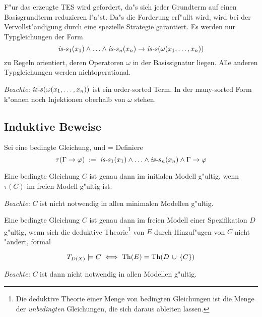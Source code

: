 F"ur das erzeugte TES wird gefordert, da"s sich jeder Grundterm auf
einen Basisgrundterm reduzieren l"a"st.
Da"s die Forderung erf"ullt wird, wird bei der Vervollst"andigung durch
eine spezielle Strategie garantiert. Es werden nur Typgleichungen der
Form
\[ \clause{\tp{s_1}(x_1) \cand \ldots \cand \tp{s_n}(x_n)}
          {\tp{s}(\omega(x_1,\ldots,x_n))} \]
zu Regeln orientiert, deren Operatoren $\omega$ in der Basissignatur
liegen. Alle anderen Typgleichungen werden nichtoperational. 

{\em Beachte:}
\( \tp{s}(\omega(x_1,\ldots,x_n)) \)
ist ein order-sorted Term. In der many-sorted Form k"onnen noch
Injektionen oberhalb von $\omega$ stehen.


\subsection{Induktive Beweise}

Sei \clause{\Gamma}{\varphi} eine bedingte Gleichung, und
\varsOf{\clause{\Gamma}{\varphi}}=
Definiere
\[ \tau(\clause{\Gamma}{\varphi}) 
   \dfeq \clause{\tp{s_1}(x_1) \cand \ldots \cand \tp{s_n}(x_n) \cand \Gamma}
                {\varphi}
\]

Eine bedingte Gleichung $C$ ist genau dann im initialen Modell g"ultig,
wenn $\tau(C)$ im freien Modell g"ultig ist.

{\em Beachte:}
$C$ ist nicht notwendig in allen minimalen Modellen g"ultig.

Eine bedingte Gleichung $C$ ist genau dann im freien Modell  einer
Spezifikation $D$ g"ultig, wenn sich die deduktive Theorie\footnote{
Die deduktive Theorie einer Menge von bedingten Gleichungen ist die Menge der
{\em unbedingten} Gleichungen, die sich daraus ableiten lassen.
}
von $E$ durch Hinzuf"ugen von $C$ nicht "andert, formal

\[ \T{D(X)} \models C  \iff  \ThOf{E}=\ThOf{\union{D}{\eset{C}}} \]

{\em Beachte:}
$C$ ist dann nicht notwendig in allen Modellen g"ultig.

